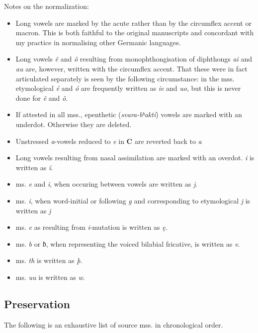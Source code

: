 Notes on the normalization:
  \begin{itemize}
    \item Long vowels are marked by the acute rather than by the circumflex accent or macron. This is both faithful to the original manuscripts and concordant with my practice in normalising other Germanic languages.
    \item Long vowels \emph{ê} and \emph{ô} resulting from monophthongisation of diphthongs \emph{ai} and \emph{au} are, however, written with the circumflex accent. That these were in fact articulated separately is seen by the following circumstance: in the mss. etymological \emph{é} and \emph{ó} are frequently written as \emph{ie} and \emph{uo}, but this is never done for \emph{ê} and \emph{ô}.
    \item If attested in all mss., epenthetic (\emph{svara-bʰaktí}) vowels are marked with an underdot. Otherwise they are deleted.
    \item Unstressed \emph{a}-vowels reduced to \emph{e} in \textbf{C} are reverted back to \emph{a}
    \item Long vowels resulting from nasal assimilation are marked with an overdot. \emph{i} is written as \emph{ï}.
    \item ms. \emph{e} and \emph{i}, when occuring between vowels are written as \emph{j}.
    \item ms. \emph{i}, when word-initial or following \emph{g} and corresponding to etymological \emph{j} is written as \emph{j}
    \item ms. \emph{e} as resulting from \emph{i}-mutation is written as \emph{ę}.
    \item ms. \emph{b} or \emph{ƀ}, when representing the voiced bilabial fricative, is written as \emph{v}.
    \item ms. \emph{th} is written as \emph{þ}.
    \item ms. \emph{uu} is written as \emph{w}.
  \end{itemize}

\subsection{Preservation}
The following is an exhaustive list of source mss. in chronological order.

